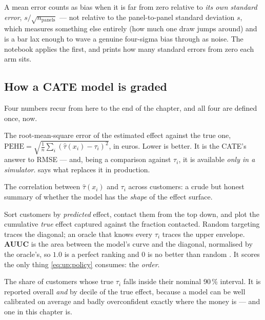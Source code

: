 \begin{remark}
A mean error counts as bias when it is far from zero relative to \emph{its own standard error},
$s/\sqrt{n_{\text{panels}}}$ --- not relative to the panel-to-panel standard deviation $s$, which
measures something else entirely (how much one draw jumps around) and is a bar lax enough to wave
a genuine four-sigma bias through as noise. The notebook applies the first, and prints how many
standard errors from zero each arm sits.
\end{remark}

\subsection*{How a CATE model is graded}

Four numbers recur from here to the end of the chapter, and all four are defined once, now.

\begin{description}[leftmargin=*, style=nextline]
  \item[PEHE --- Precision in Estimation of Heterogeneous Effects.] The root-mean-square error of
        the estimated effect against the true one,
        $\text{PEHE} = \sqrt{\tfrac1n \sum_i (\hat\tau(x_i) - \tau_i)^2}$, in euros. Lower is
        better. It is the CATE's answer to RMSE --- and, being a comparison against $\tau_i$, it
        is available \emph{only in a simulator}.  says what replaces it in
        production.
  \item[Correlation.] The correlation between $\hat\tau(x_i)$ and $\tau_i$ across customers: a
        crude but honest summary of whether the model has the \emph{shape} of the effect surface.
  \item[Qini / uplift curve and AUUC.] Sort customers by \emph{predicted} effect, contact them
        from the top down, and plot the cumulative \emph{true} effect captured against the
        fraction contacted. Random targeting traces the diagonal; an oracle that knows every
        $\tau_i$ traces the upper envelope. \textbf{AUUC} is the area between the model's curve
        and the diagonal, normalised by the oracle's, so $1.0$ is a perfect ranking and $0$ is no
        better than random \citep{radcliffe2007, radcliffe2011, gutierrez2017}. It scores the only
        thing \cref{eq:up:policy} consumes: the \emph{order}.
  \item[Coverage.] The share of customers whose true $\tau_i$ falls inside their nominal 90\,\%
        interval. It is reported overall \emph{and} by decile of the true effect, because a model
        can be well calibrated on average and badly overconfident exactly where the money is ---
        and one in this chapter is.
\end{description}

